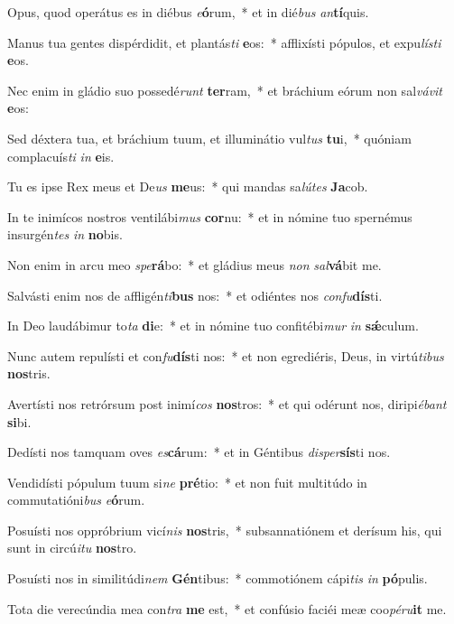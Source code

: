 \item Opus, quod operátus es in diébus \textit{e}\textbf{ó}rum,~* et in dié\textit{bus} \textit{an}\textbf{tí}quis.
\item Manus tua gentes dispérdidit, et plantás\textit{ti} \textbf{e}os:~* afflixísti pópulos, et expu\textit{lís}\textit{ti} \textbf{e}os.
\item Nec enim in gládio suo possedé\textit{runt} \textbf{ter}ram,~* et bráchium eórum non sal\textit{vá}\textit{vit} \textbf{e}os:
\item Sed déxtera tua, et bráchium tuum, et illuminátio vul\textit{tus} \textbf{tu}i,~* quóniam complacuís\textit{ti} \textit{in} \textbf{e}is.
\item Tu es ipse Rex meus et De\textit{us} \textbf{me}us:~* qui mandas sa\textit{lú}\textit{tes} \textbf{Ja}cob.
\item In te inimícos nostros ventilábi\textit{mus} \textbf{cor}nu:~* et in nómine tuo spernémus insurgén\textit{tes} \textit{in} \textbf{no}bis.
\item Non enim in arcu meo \textit{spe}\textbf{rá}bo:~* et gládius meus \textit{non} \textit{sal}\textbf{vá}bit me.
\item Salvásti enim nos de affligén\textit{ti}\textbf{bus} nos:~* et odiéntes nos \textit{con}\textit{fu}\textbf{dís}ti.
\item In Deo laudábimur to\textit{ta} \textbf{di}e:~* et in nómine tuo confitébi\textit{mur} \textit{in} \textbf{sǽ}culum.
\item Nunc autem repulísti et con\textit{fu}\textbf{dís}ti nos:~* et non egrediéris, Deus, in virtú\textit{ti}\textit{bus} \textbf{nos}tris.
\item Avertísti nos retrórsum post inimí\textit{cos} \textbf{nos}tros:~* et qui odérunt nos, diripi\textit{é}\textit{bant} \textbf{si}bi.
\item Dedísti nos tamquam oves \textit{es}\textbf{cá}rum:~* et in Géntibus \textit{di}\textit{sper}\textbf{sís}ti nos.
\item Vendidísti pópulum tuum si\textit{ne} \textbf{pré}tio:~* et non fuit multitúdo in commutatióni\textit{bus} \textit{e}\textbf{ó}rum.
\item Posuísti nos oppróbrium vicí\textit{nis} \textbf{nos}tris,~* subsannatiónem et derísum his, qui sunt in circú\textit{i}\textit{tu} \textbf{nos}tro.
\item Posuísti nos in similitúdi\textit{nem} \textbf{Gén}tibus:~* commotiónem cápi\textit{tis} \textit{in} \textbf{pó}pulis.
\item Tota die verecúndia mea con\textit{tra} \textbf{me} est,~* et confúsio faciéi meæ coo\textit{pé}\textit{ru}\textbf{it} me.
